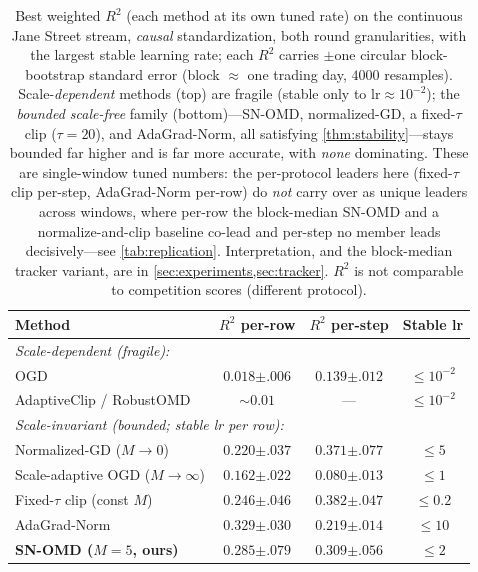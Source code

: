 \documentclass{article}
\begin{document}
\begin{table}[h]
\caption{Best weighted $R^2$ (each method at its own tuned rate) on the continuous Jane
Street stream, \emph{causal} standardization, both round granularities, with the largest
stable learning rate; each $R^2$ carries $\pm$one circular block-bootstrap standard error
(block $\approx$ one trading day, $4000$ resamples). Scale-\emph{dependent} methods (top)
are fragile (stable only to $\mathrm{lr}\!\approx\!10^{-2}$); the \emph{bounded scale-free}
family (bottom)---SN-OMD, normalized-GD, a fixed-$\tau$ clip ($\tau{=}20$), and
AdaGrad-Norm, all satisfying \cref{thm:stability}---stays bounded far higher and is far
more accurate, with \emph{none} dominating. These are single-window tuned numbers: the
per-protocol leaders here (fixed-$\tau$ clip per-step, AdaGrad-Norm per-row) do \emph{not}
carry over as unique leaders across windows, where per-row the block-median SN-OMD and a
normalize-and-clip baseline co-lead and per-step no member leads decisively---see
\cref{tab:replication}. Interpretation, and the
block-median tracker variant, are in \cref{sec:experiments,sec:tracker}. $R^2$ is not
comparable to competition scores (different protocol).}
\label{tab:jane}
\centering
\begin{small}
\setlength{\tabcolsep}{3.5pt}
\begin{tabular}{lccc}
\toprule
Method & $R^2$ per-row & $R^2$ per-step & Stable lr \\
\midrule
\multicolumn{4}{l}{\emph{Scale-dependent (fragile):}}\\
OGD                                  & $0.018{\scriptscriptstyle\pm.006}$ & $0.139{\scriptscriptstyle\pm.012}$ & $\le 10^{-2}$ \\
AdaptiveClip / RobustOMD             & $\sim0.01$ & --- & $\le 10^{-2}$ \\
\midrule
\multicolumn{4}{l}{\emph{Scale-invariant (bounded; stable lr per row):}}\\
Normalized-GD ($M\!\to\!0$)          & $0.220{\scriptscriptstyle\pm.037}$ & $0.371{\scriptscriptstyle\pm.077}$ & $\le 5$ \\
Scale-adaptive OGD ($M\!\to\!\infty$)& $0.162{\scriptscriptstyle\pm.022}$ & $0.080{\scriptscriptstyle\pm.013}$ & $\le 1$ \\
Fixed-$\tau$ clip (const $M$)        & $0.246{\scriptscriptstyle\pm.046}$ & $\mathbf{0.382}{\scriptscriptstyle\pm.047}$ & $\le 0.2$ \\
AdaGrad-Norm                         & $\mathbf{0.329}{\scriptscriptstyle\pm.030}$ & $0.219{\scriptscriptstyle\pm.014}$ & $\le 10$ \\
\textbf{SN-OMD ($M{=}5$, ours)}      & $0.285{\scriptscriptstyle\pm.079}$ & $0.309{\scriptscriptstyle\pm.056}$ & $\le 2$ \\
\bottomrule
\end{tabular}
\end{small}
\end{table}
\end{document}
